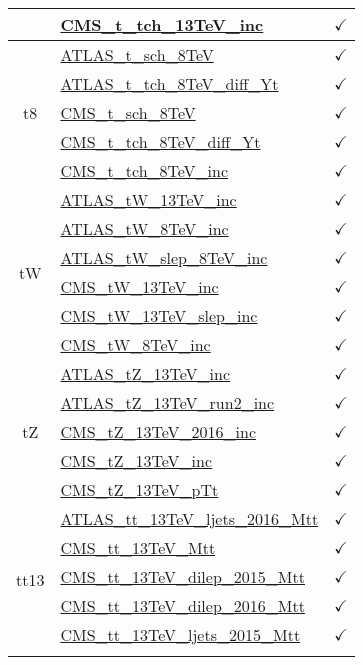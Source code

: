 \documentclass{article}
\begin{document}
\begin{longtable}{|c|l|c|}
 & \href{https://arxiv.org}{CMS_t_tch_13TeV_inc}  & $\checkmark$
\\ \hline
\multirow{5}{*}{t8}
 & \href{https://arxiv.org}{ATLAS_t_sch_8TeV}  & $\checkmark$\\ \cline{2-3}
 & \href{https://arxiv.org}{ATLAS_t_tch_8TeV_diff_Yt}  & $\checkmark$\\ \cline{2-3}
 & \href{https://arxiv.org}{CMS_t_sch_8TeV}  & $\checkmark$\\ \cline{2-3}
 & \href{https://arxiv.org}{CMS_t_tch_8TeV_diff_Yt}  & $\checkmark$\\ \cline{2-3}
 & \href{https://arxiv.org}{CMS_t_tch_8TeV_inc}  & $\checkmark$
\\ \hline
\multirow{6}{*}{tW}
 & \href{https://arxiv.org}{ATLAS_tW_13TeV_inc}  & $\checkmark$\\ \cline{2-3}
 & \href{https://arxiv.org}{ATLAS_tW_8TeV_inc}  & $\checkmark$\\ \cline{2-3}
 & \href{https://arxiv.org}{ATLAS_tW_slep_8TeV_inc}  & $\checkmark$\\ \cline{2-3}
 & \href{https://arxiv.org}{CMS_tW_13TeV_inc}  & $\checkmark$\\ \cline{2-3}
 & \href{https://arxiv.org}{CMS_tW_13TeV_slep_inc}  & $\checkmark$\\ \cline{2-3}
 & \href{https://arxiv.org}{CMS_tW_8TeV_inc}  & $\checkmark$
\\ \hline
\multirow{5}{*}{tZ}
 & \href{https://arxiv.org}{ATLAS_tZ_13TeV_inc}  & $\checkmark$\\ \cline{2-3}
 & \href{https://arxiv.org}{ATLAS_tZ_13TeV_run2_inc}  & $\checkmark$\\ \cline{2-3}
 & \href{https://arxiv.org}{CMS_tZ_13TeV_2016_inc}  & $\checkmark$\\ \cline{2-3}
 & \href{https://arxiv.org}{CMS_tZ_13TeV_inc}  & $\checkmark$\\ \cline{2-3}
 & \href{https://arxiv.org}{CMS_tZ_13TeV_pTt}  & $\checkmark$
\\ \hline
\multirow{7}{*}{tt13}
 & \href{https://arxiv.org}{ATLAS_tt_13TeV_ljets_2016_Mtt}  & $\checkmark$\\ \cline{2-3}
 & \href{https://arxiv.org}{CMS_tt_13TeV_Mtt}  & $\checkmark$\\ \cline{2-3}
 & \href{https://arxiv.org}{CMS_tt_13TeV_dilep_2015_Mtt}  & $\checkmark$\\ \cline{2-3}
 & \href{https://arxiv.org}{CMS_tt_13TeV_dilep_2016_Mtt}  & $\checkmark$\\ \cline{2-3}
 & \href{https://arxiv.org}{CMS_tt_13TeV_ljets_2015_Mtt}  & $\checkmark$\\ \cline{2-3}

\end{longtable}
\end{document}
